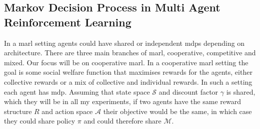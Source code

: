 \documentclass[UKenglish]{uiomasterthesis}
\begin{document}
\subsection{Markov Decision Process in Multi Agent Reinforcement Learning}
In a \ac{marl} setting agents could have shared or independent \acp{mdp} depending on architecture. There are three main branches of \ac{marl}, cooperative, competitive and mixed. Our focus will be on cooperative \ac{marl}.
In a cooperative \ac{marl} setting the goal is some social welfare function that maximises rewards for the agents, either collective rewards or a mix of collective and individual rewards. In such a setting each agent has \ac{mdp}. Assuming that state space \(\mathcal{S}\) and discount factor \(\gamma\) is shared, which they will be in all my experiments, if two agents have the same reward structure $R$ and action space \(\mathcal{A}\) their objective would be the same, in which case they could share policy \(\pi\) and could therefore share \(\mathcal{M}\).
\end{document}
